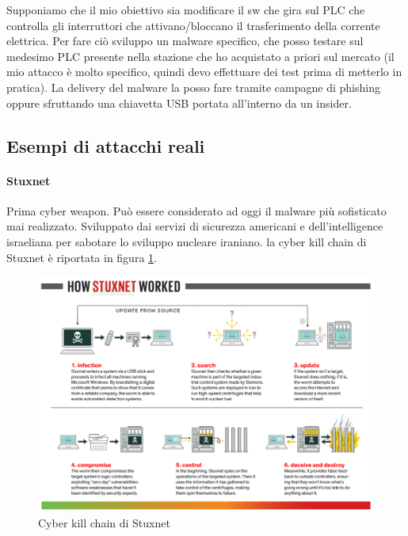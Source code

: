 Supponiamo che il mio obiettivo sia modificare il sw che gira sul PLC che controlla gli interruttori che attivano/bloccano il trasferimento della corrente elettrica. Per fare ciò sviluppo un malware specifico, che posso testare sul medesimo PLC presente nella stazione che ho acquistato a priori sul mercato (il mio attacco è molto specifico, quindi devo effettuare dei test prima di metterlo in pratica). La delivery del malware la posso fare tramite campagne di phishing oppure sfruttando una chiavetta USB portata all'interno da un insider. 
	
\subsection{Esempi di attacchi reali}

\paragraph{Stuxnet} Prima cyber weapon. Può essere considerato ad oggi il malware più sofisticato mai realizzato. Sviluppato dai servizi di sicurezza americani e dell'intelligence israeliana per sabotare lo sviluppo nucleare iraniano. la cyber kill chain di Stuxnet è riportata in figura \ref{fig:my_label5}.

\begin{figure}
    \centering
    \includegraphics[width=1\textwidth]{images/7.png}
    \caption{Cyber kill chain di Stuxnet}
    \label{fig:my_label5}
\end{figure}


